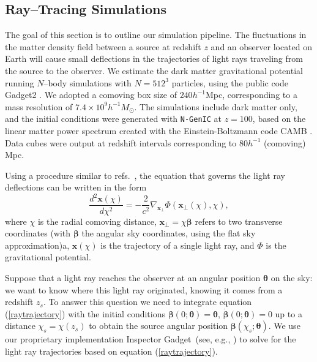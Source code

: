\documentclass[reprint,aps,prd,superscriptaddress,showkeys,showpacs]{revtex4-1}
\begin{document}
\subsection{Ray--Tracing Simulations}
\label{raysim}

The goal of this section is to outline our simulation pipeline.  The
fluctuations in the matter density field between a source at redshift
$z$ and an observer located on Earth will cause small deflections in
the trajectories of light rays traveling from the source to the
observer. 
%
We estimate the dark matter gravitational potential running $N$--body
simulations with $N=512^3$ particles, using the public code Gadget2
\citep{Gadget2}. We adopted a comoving box size of $240h^{-1}$Mpc,
corresponding to a mass resolution of $7.4\times10^9h^{-1}M_\odot$.
The simulations include dark matter only, and the initial conditions
were generated with \texttt{N-GenIC} at $z=100$, based on the linear
matter power spectrum created with the Einstein-Boltzmann code CAMB
\cite{CAMB}. Data cubes were output at redshift intervals
corresponding to $80h^{-1}$ (comoving) Mpc.

Using a procedure similar to
refs.~\citep{RayTracingJain,RayTracingHartlap}, the equation that
governs the light ray deflections can be written in the form
\begin{equation}
\label{raytrajectory}
\frac{d^2\mathbf{x}(\chi)}{d\chi^2} = -\frac{2}{c^2}\nabla_{\mathbf{x}_\perp}\Phi(\mathbf{x}_\perp(\chi),\chi),
\end{equation}
%
where $\chi$ is the radial comoving distance,
$\mathbf{x}_\perp=\chi\pmb{\beta}$ refers to two transverse
coordinates (with $\pmb{\beta}$ the angular sky coordinates, using the
flat sky approximation)a, $\mathbf{x}(\chi)$ is the trajectory of a
single light ray, and $\Phi$ is the gravitational potential.

Suppose that a light ray reaches the observer at an angular position
$\pmb{\theta}$ on the sky: we want to know where this light ray
originated, knowing it comes from a redshift $z_s$. To answer this
question we need to integrate equation (\ref{raytrajectory}) with the
initial conditions $\pmb{\beta}(0;\pmb{\theta})=\pmb{\theta}$,
$\dot{\pmb{\beta}}(0;\pmb{\theta})=0$ up to a distance
$\chi_s=\chi(z_s)$ to obtain the source angular position
$\pmb{\beta}(\chi_s;\pmb{\theta})$. We use our proprietary
implementation Inspector Gadget~(see, e.g., \cite{KHM2010}) to solve
for the light ray trajectories based on equation
(\ref{raytrajectory}).
\end{document}
